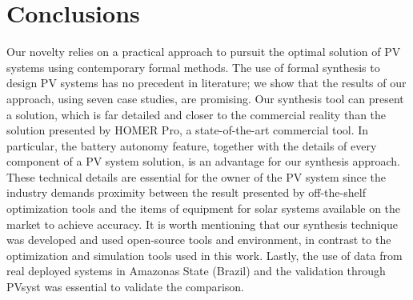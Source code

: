 \documentclass[runningheads]{llncs}
\begin{document}
\section{Conclusions} 

Our novelty relies on a practical approach to pursuit the optimal solution of PV systems using contemporary formal methods. The use of formal synthesis to design PV systems has no precedent in literature; we show that the results of our approach, using seven case studies, are promising. Our synthesis tool can present a solution, which is far detailed and closer to the commercial reality than the solution presented by HOMER Pro, a state-of-the-art commercial tool. In particular, the battery autonomy feature, together with the details of every component of a PV system solution, is an advantage for our synthesis approach. These technical details are essential for the owner of the PV system since the industry demands proximity between the result presented by off-the-shelf optimization tools and the items of equipment for solar systems available on the market to achieve accuracy. It is worth mentioning that our synthesis technique was developed and used open-source tools and environment, in contrast to the optimization and simulation tools used in this work. Lastly, the use of data from real deployed systems in Amazonas State (Brazil) and the validation through PVsyst was essential to validate the comparison.

%
%


%
\end{document}
